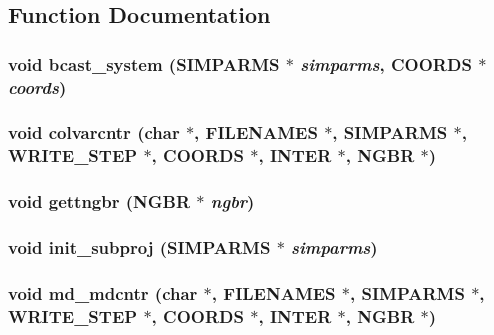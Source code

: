 \subsection{Function Documentation}
\subsubsection{\setlength{\rightskip}{0pt plus 5cm}void bcast\_\-system ({\bf SIMPARMS} $\ast$ {\em simparms}, {\bf COORDS} $\ast$ {\em coords})}\label{proto__main_8h_08f703a3495c07bb5bd8923b766db24f}


\subsubsection{\setlength{\rightskip}{0pt plus 5cm}void colvarcntr (char $\ast$, {\bf FILENAMES} $\ast$, {\bf SIMPARMS} $\ast$, {\bf WRITE\_\-STEP} $\ast$, {\bf COORDS} $\ast$, {\bf INTER} $\ast$, {\bf NGBR} $\ast$)}\label{proto__main_8h_a647b249cbffeef74abdc0d7bafe5fa5}


\subsubsection{\setlength{\rightskip}{0pt plus 5cm}void gettngbr ({\bf NGBR} $\ast$ {\em ngbr})}\label{proto__main_8h_233f2c78de3bc9ce530da8786378d2de}


\subsubsection{\setlength{\rightskip}{0pt plus 5cm}void init\_\-subproj ({\bf SIMPARMS} $\ast$ {\em simparms})}\label{proto__main_8h_aea0a0a1bc5a2ca808b9c5e2391f66c3}


\subsubsection{\setlength{\rightskip}{0pt plus 5cm}void md\_\-mdcntr (char $\ast$, {\bf FILENAMES} $\ast$, {\bf SIMPARMS} $\ast$, {\bf WRITE\_\-STEP} $\ast$, {\bf COORDS} $\ast$, {\bf INTER} $\ast$, {\bf NGBR} $\ast$)}\label{proto__main_8h_5623aa5393043464f511e1733aee5e57}


